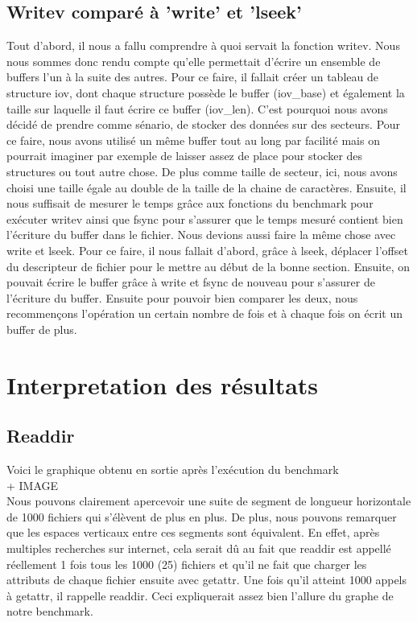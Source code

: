 \documentclass[11pt, oneside]{article}
\begin{document}
\begin{multicols}{2}
\subsection{Writev comparé à 'write' et 'lseek'}
Tout d'abord, il nous a fallu comprendre à quoi servait la fonction writev. Nous nous sommes donc rendu compte qu'elle permettait d'écrire un ensemble de buffers l'un à la suite des autres. Pour ce faire, il fallait créer un tableau de structure iov, dont chaque structure possède le buffer (iov\_base) et également la taille sur laquelle il faut écrire ce buffer (iov\_len). C'est pourquoi nous avons décidé de prendre comme sénario, de stocker des données sur des secteurs. Pour ce faire, nous avons utilisé un même buffer tout au long par facilité mais on pourrait imaginer par exemple de laisser assez de place pour stocker des structures ou tout autre chose. De plus comme taille de secteur, ici, nous avons choisi une taille égale au double de la taille de la chaine de caractères.
Ensuite, il nous suffisait de mesurer le temps grâce aux fonctions du benchmark pour exécuter writev ainsi que fsync pour s'assurer que le temps mesuré contient bien l'écriture du buffer dans le fichier.
Nous devions aussi faire la même chose avec write et lseek. Pour ce faire, il nous fallait d'abord, grâce à lseek, déplacer l'offset du descripteur de fichier pour le mettre au début de la bonne section. Ensuite, on pouvait écrire le buffer grâce à write et fsync de nouveau pour s'assurer de l'écriture du buffer.
Ensuite pour pouvoir bien comparer les deux, nous recommençons l'opération un certain nombre de fois et à chaque fois on écrit un buffer de plus.

\section{Interpretation des résultats}
\subsection{Readdir}
Voici le graphique obtenu en sortie après l'exécution du benchmark \\
+ IMAGE
\\
Nous pouvons clairement apercevoir une suite de segment de longueur horizontale de 1000 fichiers qui s'élèvent de plus en plus. De plus, nous pouvons remarquer que les espaces verticaux entre ces segments sont équivalent.  
En effet, après multiples recherches sur internet, cela serait dû au fait que readdir est appellé réellement 1 fois tous les 1000 (25) fichiers et qu'il ne fait que charger les attributs de chaque fichier ensuite avec getattr. Une fois qu'il atteint 1000 appels à getattr, il rappelle readdir. Ceci expliquerait assez bien l'allure du graphe de notre benchmark.


\end{multicols}
\end{document}
